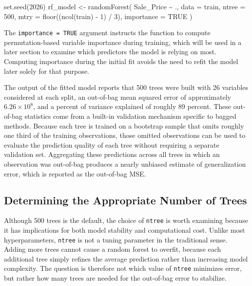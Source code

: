 \documentclass[
  11pt,
  letterpaper,
]{article}
\newenvironment{Shaded}{\begin{snugshade}}{\end{snugshade}}
\newcommand{\AttributeTok}[1]{\textcolor[rgb]{0.40,0.45,0.13}{#1}}
\newcommand{\ConstantTok}[1]{\textcolor[rgb]{0.56,0.35,0.01}{#1}}
\newcommand{\DecValTok}[1]{\textcolor[rgb]{0.68,0.00,0.00}{#1}}
\newcommand{\FunctionTok}[1]{\textcolor[rgb]{0.28,0.35,0.67}{#1}}
\newcommand{\NormalTok}[1]{\textcolor[rgb]{0.00,0.23,0.31}{#1}}
\newcommand{\OtherTok}[1]{\textcolor[rgb]{0.00,0.23,0.31}{#1}}
\newcommand{\SpecialCharTok}[1]{\textcolor[rgb]{0.37,0.37,0.37}{#1}}
\begin{document}
\begin{Shaded}
\begin{Highlighting}[]
\FunctionTok{set.seed}\NormalTok{(}\DecValTok{2026}\NormalTok{)}
\NormalTok{rf\_model }\OtherTok{\textless{}{-}} \FunctionTok{randomForest}\NormalTok{(}
\NormalTok{  Sale\_Price }\SpecialCharTok{\textasciitilde{}}\NormalTok{ .,}
  \AttributeTok{data =}\NormalTok{ train,}
  \AttributeTok{ntree =} \DecValTok{500}\NormalTok{,}
  \AttributeTok{mtry =} \FunctionTok{floor}\NormalTok{((}\FunctionTok{ncol}\NormalTok{(train) }\SpecialCharTok{{-}} \DecValTok{1}\NormalTok{) }\SpecialCharTok{/} \DecValTok{3}\NormalTok{),}
  \AttributeTok{importance =} \ConstantTok{TRUE}
\NormalTok{)}
\end{Highlighting}
\end{Shaded}

The \texttt{importance\ =\ TRUE} argument instructs the function to
compute permutation-based variable importance during training, which
will be used in a later section to examine which predictors the model is
relying on most. Computing importance during the initial fit avoids the
need to refit the model later solely for that purpose.

The output of the fitted model reports that 500 trees were built with 26
variables considered at each split, an out-of-bag mean squared error of
approximately \(6.26 \times 10^8\), and a percent of variance explained
of roughly 89 percent. These out-of-bag statistics come from a built-in
validation mechanism specific to bagged methods. Because each tree is
trained on a bootstrap sample that omits roughly one third of the
training observations, those omitted observations can be used to
evaluate the prediction quality of each tree without requiring a
separate validation set. Aggregating these predictions across all trees
in which an observation was out-of-bag produces a nearly unbiased
estimate of generalization error, which is reported as the out-of-bag
MSE.

\subsection{Determining the Appropriate Number of
Trees}\label{determining-the-appropriate-number-of-trees}

Although 500 trees is the default, the choice of \texttt{ntree} is worth
examining because it has implications for both model stability and
computational cost. Unlike most hyperparameters, \texttt{ntree} is not a
tuning parameter in the traditional sense. Adding more trees cannot
cause a random forest to overfit, because each additional tree simply
refines the average prediction rather than increasing model complexity.
The question is therefore not which value of \texttt{ntree} minimizes
error, but rather how many trees are needed for the out-of-bag error to
stabilize.
\end{document}
